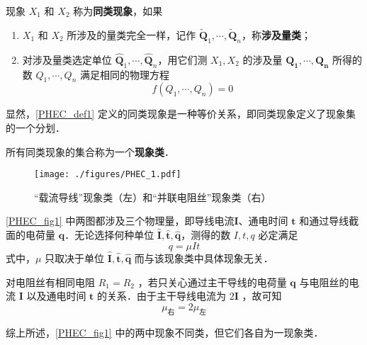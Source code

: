 \begin{definition}{}\label{PHEC_def1}
现象 $X_1$ 和 $X_2$ 称为\textbf{同类现象}，如果
\begin{enumerate}
\item $X_1$ 和 $X_2$ 所涉及的量类完全一样，记作 $\tilde{\boldsymbol{Q}}_1,\cdots,\tilde{\boldsymbol{Q}}_n$，称\textbf{涉及量类}； 
\item 对涉及量类选定单位 $\hat{\boldsymbol{Q}}_1,\cdots,\hat{\boldsymbol{Q}}_n$，用它们测 $X_1,X_2$ 的涉及量 $\boldsymbol{Q_1},\cdots ,\boldsymbol{Q_n}$ 所得的数 $Q_1,\cdots,Q_n$ 满足相同的物理方程
\begin{equation}
f(Q_1,\cdots,Q_n)=0
\end{equation}
\end{enumerate}
\end{definition}
显然，\autoref{PHEC_def1} 定义的同类现象是一种等价关系，即同类现象定义了现象集的一个分划．
\begin{definition}{}
所有同类现象的集合称为一个\textbf{现象类}．
\end{definition}
\begin{example}{}
\begin{figure}[ht]
\centering
\texttt{[image: ./figures/PHEC\_1.pdf]}
\caption{“载流导线”现象类（左）和“并联电阻丝”现象类（右）} \label{PHEC_fig1}
\end{figure}
\autoref{PHEC_fig1} 中两图都涉及三个物理量，即导线电流$\boldsymbol{I}$、通电时间 $\boldsymbol{t}$ 和通过导线截面的电荷量 $\boldsymbol{q}$．无论选择何种单位 $\hat{\boldsymbol{I}},\hat{\boldsymbol{t}},\hat{\boldsymbol{q}}$，测得的数 $I,t,q$ 必定满足
\begin{equation}
q=\mu It
\end{equation}
式中，$\mu$ 只取决于单位 $\hat{\boldsymbol{I}},\hat{\boldsymbol{t}},\hat{\boldsymbol{q}}$ 而与该现象类中具体现象无关．

对电阻丝有相同电阻 $R_1=R_2$ ，若只关心通过主干导线的电荷量 $\boldsymbol{q}$ 与电阻丝的电流 $\boldsymbol{I}$ 以及通电时间 $\boldsymbol{t}$ 的关系．由于主干导线电流为 $2\boldsymbol{I}$ ，故可知 
\begin{equation}
\mu_{\text{右}}=2\mu_{\text{左}}
\end{equation}

综上所述，\autoref{PHEC_fig1} 中的两中现象不同类，但它们各自为一现象类．
\end{example}